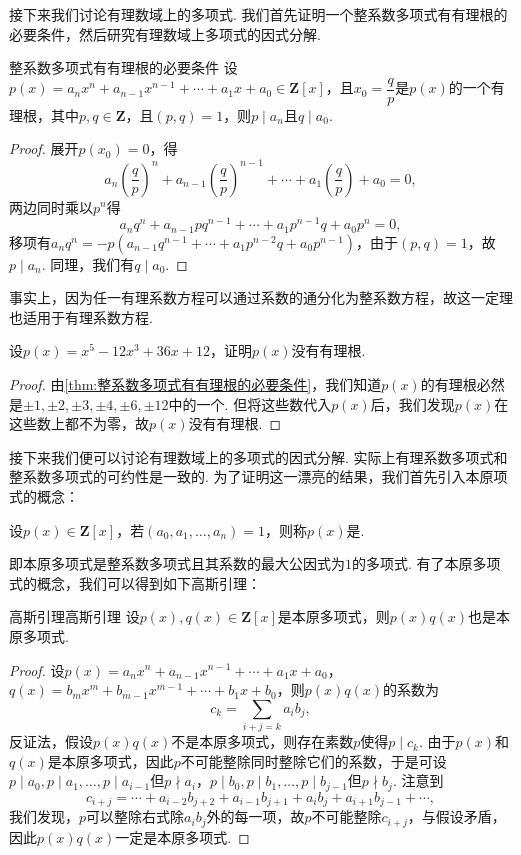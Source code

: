 接下来我们讨论有理数域上的多项式. 我们首先证明一个整系数多项式有有理根的必要条件，然后研究有理数域上多项式的因式分解.
\begin{theorem}{}{整系数多项式有有理根的必要条件}
    设$p(x)=a_nx^n+a_{n-1}x^{n-1}+\cdots+a_1x+a_0\in\mathbf{Z}[x]$，且$x_0=\dfrac{q}{p}$是$p(x)$的一个有理根，其中$p,q\in\mathbf{Z}$，且$(p,q)=1$，则$p\mid a_n$且$q\mid a_0$.
\end{theorem}
\begin{proof}
    展开$p(x_0)=0$，得
    \[a_n\left(\dfrac{q}{p}\right)^n+a_{n-1}\left(\dfrac{q}{p}\right)^{n-1}+\cdots+a_1\left(\dfrac{q}{p}\right)+a_0=0,\]
    两边同时乘以$p^n$得
    \[a_nq^n+a_{n-1}pq^{n-1}+\cdots+a_1p^{n-1}q+a_0p^n=0,\]
    移项有$a_nq^n=-p(a_{n-1}q^{n-1}+\cdots+a_1p^{n-2}q+a_0p^{n-1})$，由于$(p,q)=1$，故$p\mid a_n$. 同理，我们有$q\mid a_0$.
\end{proof}

事实上，因为任一有理系数方程可以通过系数的通分化为整系数方程，故这一定理也适用于有理系数方程.
\begin{example}{}{}
    设$p(x)=x^5-12x^3+36x+12$，证明$p(x)$没有有理根.
\end{example}
\begin{proof}
    由\autoref{thm:整系数多项式有有理根的必要条件}，我们知道$p(x)$的有理根必然是$\pm 1,\pm 2,\pm 3,\pm 4,\pm 6,\pm 12$中的一个. 但将这些数代入$p(x)$后，我们发现$p(x)$在这些数上都不为零，故$p(x)$没有有理根.
\end{proof}

接下来我们便可以讨论有理数域上的多项式的因式分解. 实际上有理系数多项式和整系数多项式的可约性是一致的. 为了证明这一漂亮的结果，我们首先引入本原项式的概念：
\begin{definition}{}{}
    设$p(x)\in\mathbf{Z}[x]$，若$(a_0,a_1,\ldots,a_n)=1$，则称$p(x)$是.
\end{definition}
即本原多项式是整系数多项式且其系数的最大公因式为$1$的多项式. 有了本原多项式的概念，我们可以得到如下高斯引理：
\begin{lemma}{高斯引理}{高斯引理}
    设$p(x),q(x)\in\mathbf{Z}[x]$是本原多项式，则$p(x)q(x)$也是本原多项式.
\end{lemma}
\begin{proof}
    设$p(x)=a_nx^n+a_{n-1}x^{n-1}+\cdots+a_1x+a_0$，$q(x)=b_mx^m+b_{m-1}x^{m-1}+\cdots+b_1x+b_0$，则$p(x)q(x)$的系数为
    \[c_k=\sum_{i+j=k}a_ib_j,\]
    反证法，假设$p(x)q(x)$不是本原多项式，则存在素数$p$使得$p\mid c_k$. 由于$p(x)$和$q(x)$是本原多项式，因此$p$不可能整除同时整除它们的系数，于是可设$p\mid a_0,p\mid a_1,\ldots,p\mid a_{i-1}$但$p\nmid a_i$，$p\mid b_0,p\mid b_1,\ldots,p\mid b_{j-1}$但$p\nmid b_j$. 注意到
    \[c_{i+j}=\cdots+a_{i-2}b_{j+2}+a_{i-1}b_{j+1}+a_ib_j+a_{i+1}b_{j-1}+\cdots,\]
    我们发现，$p$可以整除右式除$a_ib_j$外的每一项，故$p$不可能整除$c_{i+j}$，与假设矛盾，因此$p(x)q(x)$一定是本原多项式.
\end{proof}

